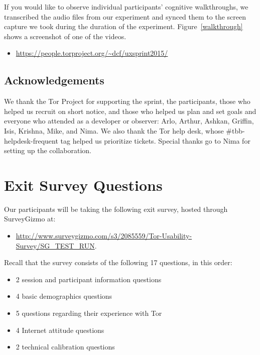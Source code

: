 \documentclass[letterpaper,twocolumn,11pt]{article}
\begin{document}
\indent \indent If you would like to observe individual participants' cognitive walkthroughs, 
we transcribed the audio files from our experiment
and synced them to the screen capture we took during the duration of the experiment.
Figure~\ref{walkthrough} shows a screenshot of one of the videos.
\begin{itemize} \itemsep1pt \parskip0pt 
\item \url{https://people.torproject.org/~dcf/uxsprint2015/}
\end{itemize}

\subsection{Acknowledgements}
\indent \indent We thank the Tor Project for supporting the sprint, the participants, those who helped us recruit on short notice, and those who helped us plan and set goals and everyone who attended as a developer or observer: Arlo, Arthur, Ashkan, Griffin, Isis, Krishna, Mike, and Nima. We also thank the Tor help desk, whose \#tbb-helpdesk-frequent tag helped us prioritize tickets. Special thanks go to Nima for setting up the collaboration.

\section{Exit Survey Questions}
\label{sec:survey} 
\indent \indent Our participants will be taking the following exit survey, hosted through
SurveyGizmo at: 
\begin{itemize} \itemsep1pt \parskip0pt 
\item \url{http://www.surveygizmo.com/s3/2085559/Tor-Usability-Survey/SG_TEST_RUN}.
\end{itemize}

\noindent Recall that the survey consists of the following 17 questions, in this order: 
\begin{itemize} \itemsep1pt \parskip0pt 
\item 2 session and participant information questions
\item 4 basic demographics questions
\item 5 questions regarding their experience with Tor
\item 4 Internet attitude questions
\item 2 technical calibration questions
\end{itemize}
\end{document}
